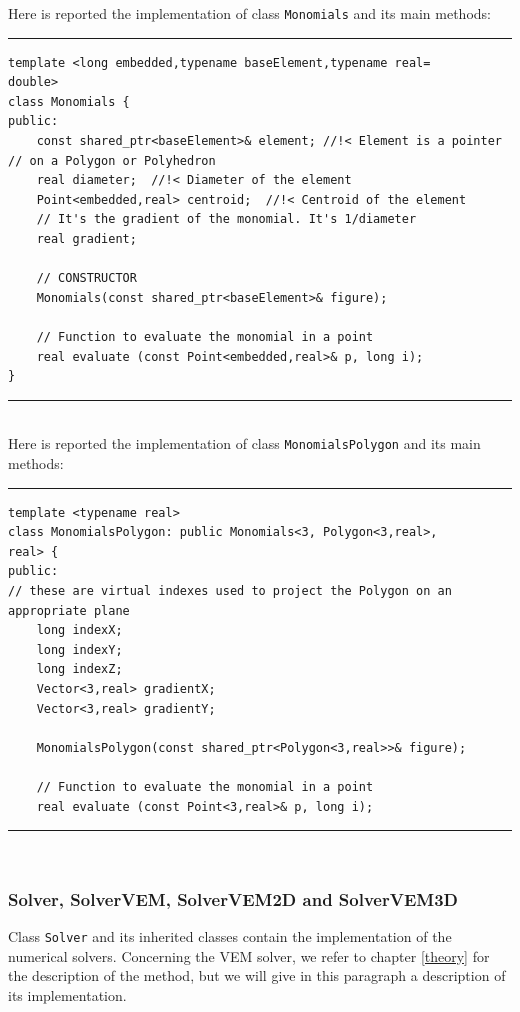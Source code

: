Here is reported the implementation of class \verb|Monomials| and its main methods:

\noindent\rule{16cm}{1pt}
\begin{lstlisting}[caption=File \texttt{Monomials.h}]
template <long embedded,typename baseElement,typename real=
double>
class Monomials {
public:
    const shared_ptr<baseElement>& element; //!< Element is a pointer
// on a Polygon or Polyhedron 
    real diameter;  //!< Diameter of the element
    Point<embedded,real> centroid;  //!< Centroid of the element
    // It's the gradient of the monomial. It's 1/diameter
    real gradient;

    // CONSTRUCTOR
    Monomials(const shared_ptr<baseElement>& figure);

    // Function to evaluate the monomial in a point
    real evaluate (const Point<embedded,real>& p, long i);
}
\end{lstlisting}
\noindent\rule{16cm}{1pt}\\

Here is reported the implementation of class \verb|MonomialsPolygon| and its main methods:

\noindent\rule{16cm}{1pt}
\begin{lstlisting}[caption=File \texttt{MonomialsPolygon.h}]
template <typename real>
class MonomialsPolygon: public Monomials<3, Polygon<3,real>,
real> {
public:
// these are virtual indexes used to project the Polygon on an appropriate plane
    long indexX;
    long indexY;
    long indexZ;
    Vector<3,real> gradientX;
    Vector<3,real> gradientY;
	
    MonomialsPolygon(const shared_ptr<Polygon<3,real>>& figure); 
    
    // Function to evaluate the monomial in a point
    real evaluate (const Point<3,real>& p, long i);
\end{lstlisting}

\noindent\rule{16cm}{1pt}\\

\subsubsection{Solver, SolverVEM, SolverVEM2D and SolverVEM3D}
Class \verb|Solver| and its inherited classes contain the implementation of the numerical solvers. Concerning the VEM solver, we refer to chapter \ref{theory} for the description of the method, but we will give in this paragraph a description of its implementation. 

